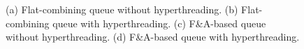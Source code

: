 \documentclass[11pt]{article}
\begin{document}
\begin{figure}[ht!]
\centering
{}

\caption{(a) Flat-combining queue without hyperthreading. (b) Flat-combining queue with hyperthreading. 
(c) F\&A-based queue without hyperthreading. (d) F\&A-based queue with hyperthreading. }
\label{figure:FC_FandA_queues}
\end{figure}


\newpage





\appendix
\end{document}
